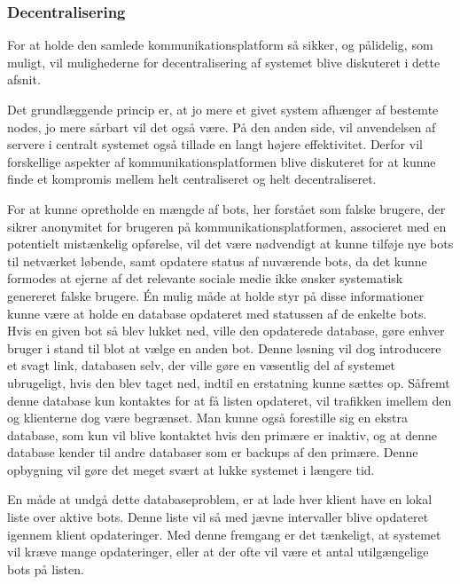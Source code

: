 \subsubsection{Decentralisering}
\label{Decentralisering}
For at holde den samlede kommunikationsplatform så sikker, og pålidelig, som muligt, vil mulighederne for decentralisering af systemet blive diskuteret i dette afsnit.

Det grundlæggende princip er, at jo mere et givet system afhænger af bestemte nodes, jo mere sårbart vil det også være. På den anden side, vil anvendelsen af servere i centralt systemet også tillade en langt højere effektivitet. Derfor vil forskellige aspekter af kommunikationsplatformen blive diskuteret for at kunne finde et kompromis mellem helt centraliseret og helt decentraliseret.

For at kunne opretholde en mængde af bots, her forstået som falske brugere, der sikrer anonymitet for brugeren på kommunikationsplatformen, associeret med en potentielt mistænkelig opførelse, vil det være nødvendigt at kunne tilføje nye bots til netværket løbende, samt opdatere status af nuværende bots, da det kunne formodes at ejerne af det relevante sociale medie ikke ønsker systematisk genereret falske brugere. Én mulig måde at holde styr på disse informationer kunne være at holde en database opdateret med statussen af de enkelte bots. Hvis en given bot så blev lukket ned, ville den opdaterede database, gøre enhver bruger i stand til blot at vælge en anden bot. Denne løsning vil dog introducere et svagt link, databasen selv, der ville gøre en væsentlig del af systemet ubrugeligt, hvis den blev taget ned, indtil en erstatning kunne sættes op. Såfremt denne database kun kontaktes for at få listen opdateret, vil trafikken imellem den og klienterne dog være begrænset. Man kunne også forestille sig en ekstra database, som kun vil blive kontaktet hvis den primære er inaktiv, og at denne database kender til andre databaser som er backups af den primære. Denne opbygning vil gøre det meget svært at lukke systemet i længere tid.

En måde at undgå dette databaseproblem, er at lade hver klient have en lokal liste over aktive bots. Denne liste vil så med jævne intervaller blive opdateret igennem klient opdateringer. Med denne fremgang er det tænkeligt, at systemet vil kræve mange opdateringer, eller at der ofte vil være et antal utilgængelige bots på listen. 

